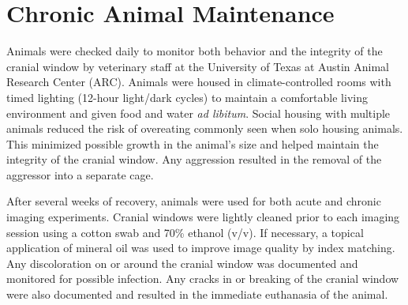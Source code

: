 \section{Chronic Animal Maintenance}

Animals were checked daily to monitor both behavior and the integrity of the cranial window by veterinary staff at the University of Texas at Austin Animal Research Center (ARC). Animals were housed in climate-controlled rooms with timed lighting (12-hour light/dark cycles) to maintain a comfortable living environment and given food and water \textit{ad libitum}. Social housing with multiple animals reduced the risk of overeating commonly seen when solo housing animals. This minimized possible growth in the animal's size and helped maintain the integrity of the cranial window. Any aggression resulted in the removal of the aggressor into a separate cage.

After several weeks of recovery, animals were used for both acute and chronic imaging experiments. Cranial windows were lightly cleaned prior to each imaging session using a cotton swab and 70\% ethanol (v/v). If necessary, a topical application of mineral oil was used to improve image quality by index matching. Any discoloration on or around the cranial window was documented and monitored for possible infection. Any cracks in or breaking of the cranial window were also documented and resulted in the immediate euthanasia of the animal.


